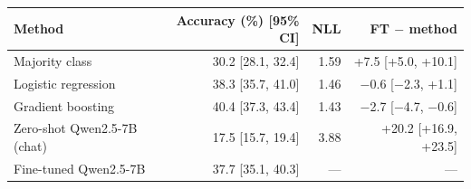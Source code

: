\setlength{\tabcolsep}{3pt}
\begin{tabular}{@{}lrrr@{}}
\toprule
\textbf{Method} & \textbf{Accuracy (\%) [95\% CI]} & \textbf{NLL} & \textbf{FT $-$ method} \\
\midrule
Majority class & 30.2 [28.1, 32.4] & 1.59 & +7.5 [+5.0, +10.1] \\
Logistic regression & 38.3 [35.7, 41.0] & 1.46 & $-$0.6 [$-$2.3, +1.1] \\
Gradient boosting & 40.4 [37.3, 43.4] & 1.43 & $-$2.7 [$-$4.7, $-$0.6] \\
Zero-shot Qwen2.5-7B (chat) & 17.5 [15.7, 19.4] & 3.88 & +20.2 [+16.9, +23.5] \\
Fine-tuned Qwen2.5-7B & 37.7 [35.1, 40.3] & --- & --- \\
\bottomrule
\end{tabular}